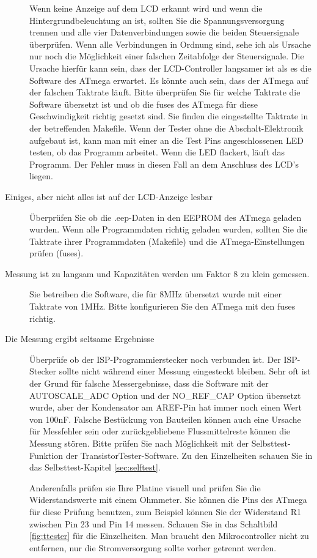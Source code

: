 \begin{description}
Wenn keine Anzeige auf dem LCD erkannt wird und wenn die Hintergrundbeleuchtung an ist,
sollten Sie die Spannungsversorgung trennen und alle vier Datenverbindungen sowie die 
beiden Steuersignale überprüfen.
Wenn alle Verbindungen in Ordnung sind, sehe ich als Ursache nur noch die Möglichkeit einer
falschen Zeitabfolge der Steuersignale.
Die Ursache hierfür kann sein, dass der LCD-Controller langsamer ist als es die Software
des ATmega erwartet. Es könnte auch sein, dass der ATmega auf der falschen Taktrate läuft.
Bitte überprüfen Sie für welche Taktrate die Software übersetzt ist und ob
die fuses des ATmega für diese Geschwindigkeit richtig gesetzt sind.
Sie finden die eingestellte Taktrate in der betreffenden Makefile.
Wenn der Tester ohne die Abschalt-Elektronik aufgebaut ist, kann man mit einer
an die Test Pins angeschlossenen LED testen, ob das Programm arbeitet.
Wenn die LED flackert, läuft das Programm. Der Fehler muss in diesen Fall an
dem Anschluss des LCD's liegen. 
\item[Einiges, aber nicht alles ist auf der LCD-Anzeige lesbar] 
Überprüfen Sie ob die .eep-Daten in den EEPROM des ATmega geladen wurden.
Wenn alle Programmdaten richtig geladen wurden, sollten Sie die Taktrate ihrer
Programmdaten (Makefile) und die ATmega-Einstellungen prüfen (fuses).

\item[Messung ist zu langsam und Kapazitäten werden um Faktor 8 zu klein gemessen.] 
Sie betreiben die Software, die für 8MHz übersetzt wurde mit einer Taktrate von 1MHz.
Bitte konfigurieren Sie den ATmega mit den fuses richtig.

\item[Die Messung ergibt seltsame Ergebnisse]  
Überprüfe ob der ISP-Programmierstecker noch verbunden ist.
Der ISP-Stecker sollte nicht während einer Messung eingesteckt bleiben.
Sehr oft ist der Grund für falsche Messergebnisse, dass die Software mit der
 AUTOSCALE\_ADC Option und der NO\_REF\_CAP Option übersetzt wurde, aber der
Kondensator am AREF-Pin hat immer noch einen Wert von 100nF.
Falsche Bestückung von Bauteilen können auch eine Ursache für Messfehler sein 
oder zurückgebliebene Flussmittelreste können die Messung stören.
Bitte prüfen Sie nach Möglichkeit mit der Selbsttest-Funktion der
TransistorTester-Software.
Zu den Einzelheiten schauen Sie in das Selbsttest-Kapitel \ref{sec:selftest}.

Anderenfalls prüfen sie Ihre Platine visuell und prüfen Sie die Widerstandswerte
mit einem Ohmmeter. Sie können die Pins des ATmega für diese Prüfung benutzen,
zum Beispiel können Sie der Widerstand R1 zwischen Pin 23 und Pin 14 messen.
Schauen Sie in das Schaltbild \ref{fig:ttester} für die Einzelheiten.
Man braucht den Mikrocontroller nicht zu entfernen, nur die Stromversorgung sollte
vorher getrennt werden.


\end{description}
